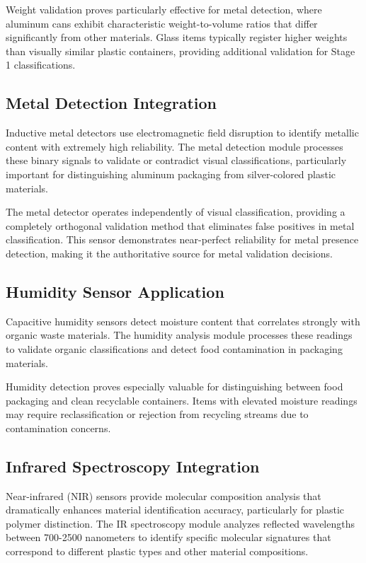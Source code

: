 \documentclass[11pt, a4paper]{article}
\begin{document}
Weight validation proves particularly effective for metal detection, where aluminum cans exhibit characteristic weight-to-volume ratios that differ significantly from other materials. Glass items typically register higher weights than visually similar plastic containers, providing additional validation for Stage 1 classifications.

\subsection{Metal Detection Integration}
Inductive metal detectors use electromagnetic field disruption to identify metallic content with extremely high reliability. The metal detection module processes these binary signals to validate or contradict visual classifications, particularly important for distinguishing aluminum packaging from silver-colored plastic materials.

The metal detector operates independently of visual classification, providing a completely orthogonal validation method that eliminates false positives in metal classification. This sensor demonstrates near-perfect reliability for metal presence detection, making it the authoritative source for metal validation decisions.

\subsection{Humidity Sensor Application}
Capacitive humidity sensors detect moisture content that correlates strongly with organic waste materials. The humidity analysis module processes these readings to validate organic classifications and detect food contamination in packaging materials.

Humidity detection proves especially valuable for distinguishing between food packaging and clean recyclable containers. Items with elevated moisture readings may require reclassification or rejection from recycling streams due to contamination concerns.

\subsection{Infrared Spectroscopy Integration}
Near-infrared (NIR) sensors provide molecular composition analysis that dramatically enhances material identification accuracy, particularly for plastic polymer distinction. The IR spectroscopy module analyzes reflected wavelengths between 700-2500 nanometers to identify specific molecular signatures that correspond to different plastic types and other material compositions.
\end{document}
